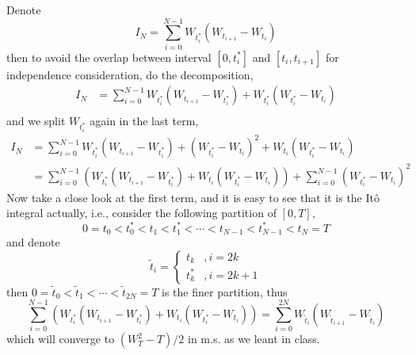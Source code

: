     \problem
    Denote
    \[I_N=\sum_{i=0}^{N-1}W_{t_i^*}(W_{t_{i+1}}-W_{t_i})\]
    then to avoid the overlap between interval $[0,t_i^*]$ and $[t_i,t_{i+1}]$
    for independence consideration, do the decomposition,
    \[\begin{aligned}
        I_N&=\sum_{i=0}^{N-1}W_{t_i^*}(W_{t_{i+1}}-W_{t_i^*})
        +W_{t_i^*}(W_{t_i^*}-W_{t_i})\\
    \end{aligned}\]
    and we split $W_{t_i^*}$ again in the last term,
    \[\begin{aligned}
        I_N&=\sum_{i=0}^{N-1}W_{t_i^*}(W_{t_{i+1}}-W_{t_i^*})
        +(W_{t_i^*}-W_{t_i})^2+W_{t_i}(W_{t_i^*}-W_{t_i})\\
        &=\sum_{i=0}^{N-1}\left(W_{t_i^*}(W_{t_{i+1}}-W_{t_i^*})
            +W_{t_i}(W_{t_i^*}-W_{t_i})\right)
          +\sum_{i=0}^{N-1}(W_{t_i^*}-W_{t_i})^2
    \end{aligned}\]
    Now take a close look at the first term, and it is easy to
    see that it is the It\^o  integral actually, i.e., consider
    the following partition of $[0,T]$,
    \[0=t_0<t_0^*<t_1<t_1^*<\cdots<t_{N-1}<t_{N-1}^*<t_N=T\]
    and denote 
    \[\tilde t_i=\begin{cases}
        t_k&,i=2k\\
        t_k^*&,i=2k+1
    \end{cases}\]
    then $0=\tilde t_0<\tilde t_1<\cdots<\tilde t_{2N}=T$ is the finer
    partition, thus
    \[\sum_{i=0}^{N-1}\left(W_{t_i^*}(W_{t_{i+1}}-W_{t_i^*})
            +W_{t_i}(W_{t_i^*}-W_{t_i})\right)
    =\sum_{i=0}^{2N}W_{\tilde t_i}(W_{\tilde t_{i+1}}-W_{\tilde t_i})\]
    which will converge to $(W_T^2-T)/2$ in m.s. as we leant
    in class.

